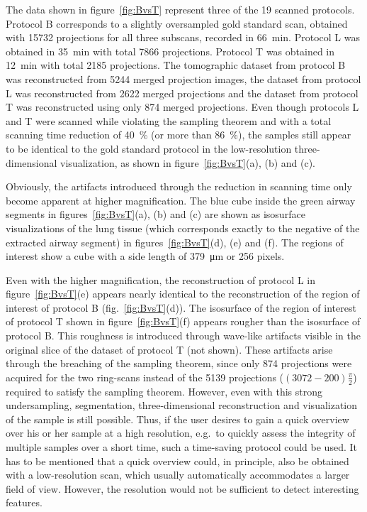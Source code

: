 The data shown in figure~\ref{fig:BvsT} represent three of the 19 scanned protocols. Protocol B corresponds to a slightly oversampled gold standard scan, obtained with 15732 projections for all three subscans, recorded in \SI{66}{\minute}. Protocol L was obtained in \SI{35}{\minute} with total 7866 projections. Protocol T was obtained in \SI{12}{\minute} with total 2185 projections. The tomographic dataset from protocol B was reconstructed from 5244 merged projection images, the dataset from protocol L was reconstructed from 2622 merged projections and the dataset from protocol T was reconstructed using only 874 merged projections. Even though protocols L and T were scanned while violating the sampling theorem and with a total scanning time reduction of \SI{40}{\percent} (or more than \SI{86}{\percent}), the samples still appear to be identical to the gold standard protocol in the low-resolution three-dimensional visualization, as shown in figure~\ref{fig:BvsT}(a), (b) and (c).

Obviously, the artifacts introduced through the reduction in scanning time only become apparent at higher magnification. The blue cube inside the green airway segments in figures~\ref{fig:BvsT}(a), (b) and (c) are shown as isosurface visualizations of the lung tissue (which corresponds exactly to the negative of the extracted airway segment) in figures~\ref{fig:BvsT}(d), (e) and (f). The regions of interest show a cube with a side length of \SI{379}{\micro\meter} or 256 pixels.

Even with the higher magnification, the reconstruction of protocol L in figure~\ref{fig:BvsT}(e) appears nearly identical to the reconstruction of the region of interest of protocol B (fig.~\ref{fig:BvsT}(d)). The isosurface of the region of interest of protocol T shown in figure~\ref{fig:BvsT}(f) appears rougher than the isosurface of protocol B. This roughness is introduced through wave-like artifacts visible in the original slice of the dataset of protocol T (not shown). These artifacts arise through the breaching of the sampling theorem, since only 874 projections were acquired for the two ring-scans instead of the 5139 projections ($(3072-200)\frac{\pi}{2}$) required to satisfy the sampling theorem. However, even with this strong undersampling, segmentation, three-dimensional reconstruction and visualization of the sample is still possible. Thus, if the user desires to gain a quick overview over his or her sample at a high resolution, e.g.\ to quickly assess the integrity of multiple samples over a short time, such a time-saving protocol could be used. It has to be mentioned that a quick overview could, in principle, also be obtained with a low-resolution scan, which usually automatically accommodates a larger field of view. However, the resolution would not be sufficient to detect interesting features.

